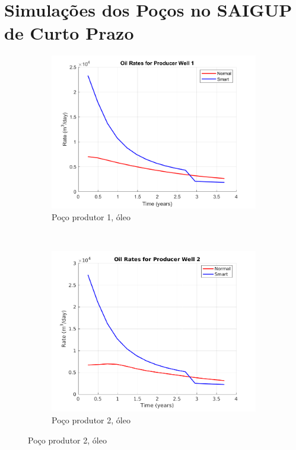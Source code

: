 \chapter{Simula\c{c}\~{o}es dos Po\c{c}os no SAIGUP de Curto Prazo}\label{apn:sSAIGUP}
\begin{figure}[!ht]
	\centering
	\begin{subfigure}[b]{.45\textwidth}
		\includegraphics[width=\textwidth]{figs/resultadosSSAIGUP/SSAIGUP_OilWell1_Zoom}
		\caption{Po\c{c}o produtor 1, \'{o}leo}
		\label{SSAIGUP_OilWell1}
	\end{subfigure}
	~
	\begin{subfigure}[b]{.45\textwidth}
		\includegraphics[width=\textwidth]{figs/resultadosSSAIGUP/SSAIGUP_OilWell2_Zoom}
		\caption{Po\c{c}o produtor 2, \'{o}leo}
		\label{SSAIGUP_OilWell2}
	\end{subfigure}
	

\end{figure}
